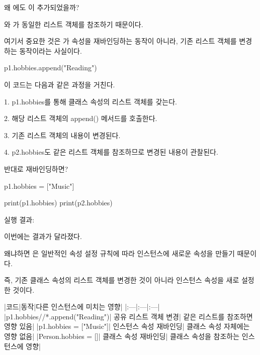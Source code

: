 왜 에도 이 추가되었을까?

와 가 동일한 리스트 객체를 참조하기 때문이다.

여기서 중요한 것은 가 속성을 재바인딩하는 동작이 아니라, 기존 리스트 객체를 변경하는 동작이라는 사실이다.

\begin{dhkcode}
p1.hobbies.append("Reading")
\end{dhkcode}

이 코드는 다음과 같은 과정을 거친다.

\begin{dhksmry}
1. p1.hobbies를 통해 클래스 속성의 리스트 객체를 갖는다.

2. 해당 리스트 객체의 append() 메서드를 호출한다.

3. 기존 리스트 객체의 내용이 변경된다.

4. p2.hobbies도 같은 리스트 객체를 참조하므로 변경된 내용이 관찰된다.
\end{dhksmry}

\begin{dhknote}
\begin{dhksmry}[centered]
반대로 재바인딩하면?
\end{dhksmry}
\end{dhknote}

\begin{dhkcode}
p1.hobbies = ["Music"]

print(p1.hobbies)
print(p2.hobbies)
\end{dhkcode}

실행 결과:

\begin{dhkzsh}
['Music']
['Reading']
\end{dhkzsh}

이번에는 결과가 달라졌다.

왜냐하면 은 일반적인 속성 설정 규칙에 따라  인스턴스에 새로운  속성을 만들기 때문이다.

즉, 기존 클래스 속성의 리스트 객체를 변경한 것이 아니라 인스턴스 속성을 새로 설정한 것이다.

\begin{dhktable}
|코드|동작|다른 인스턴스에 미치는 영향|
|:---|:---|:---|
|p1.hobbies//*.append("Reading")|	공유 리스트 객체 변경|	같은 리스트를 참조하면 영향 있음|
|p1.hobbies = ["Music"]|	인스턴스 속성 재바인딩|	클래스 속성 자체에는 영향 없음|
|Person.hobbies = []|	클래스 속성 재바인딩|	클래스 속성을 참조하는 인스턴스에 영향|
\end{dhktable}

